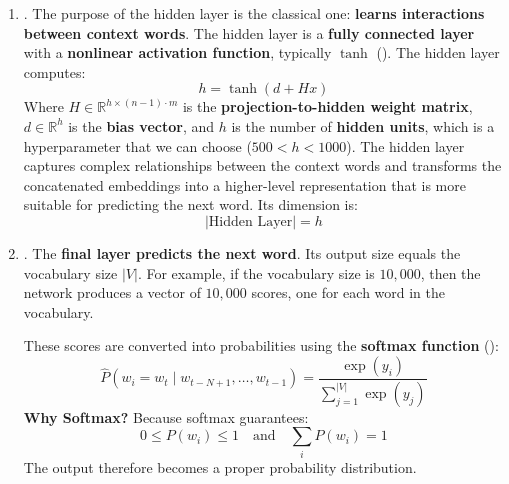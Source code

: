 \begin{enumerate}
    
    \item {}. The purpose of the hidden layer is the classical one: \textbf{learns interactions between context words}. The hidden layer is a \textbf{fully connected layer} with a \textbf{nonlinear activation function}, typically $\tanh$ (). The hidden layer computes:
    \begin{equation*}
        h = \tanh\left(d + Hx\right)
    \end{equation*}
    Where $H \in \mathbb{R}^{h \times (n-1) \cdot m}$ is the \textbf{projection-to-hidden weight matrix}, $d \in \mathbb{R}^h$ is the \textbf{bias vector}, and $h$ is the number of \textbf{hidden units}, which is a hyperparameter that we can choose ($500 < h < 1000$). The hidden layer captures complex relationships between the context words and transforms the concatenated embeddings into a higher-level representation that is more suitable for predicting the next word. Its dimension is:
    \begin{equation*}
        \left|\text{Hidden Layer}\right| = h
    \end{equation*}

    
    \item {}. The \textbf{final layer predicts the next word}. Its output size equals the vocabulary size $\left|V\right|$. For example, if the vocabulary size is $10,000$, then the network produces a vector of $10,000$ scores, one for each word in the vocabulary.
    
    \highspace
    These scores are converted into probabilities using the \textbf{softmax function} ():
    \begin{equation*}
        \hat{P}\left(w_i = w_t \mid w_{t-N+1}, \ldots, w_{t-1}\right) = \frac{\exp\left(y_i\right)}{\sum_{j=1}^{\left|V\right|} \exp\left(y_j\right)}
    \end{equation*}
    \textcolor{Green3}{ \textbf{Why Softmax?}} Because softmax guarantees:
    \begin{equation*}
        0 \leq P\left(w_i\right) \leq 1 \quad \text{and} \quad \sum_i P\left(w_i\right) = 1
    \end{equation*}
    The output therefore becomes a proper probability distribution.
\end{enumerate}

